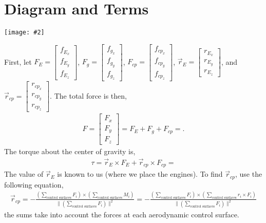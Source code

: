 \documentclass[11pt]{article}
\newcommand{\img}[2]{\begin{center}\texttt{[image: \#2]}\end{center}}
\newcommand{\mathse}[1]{\begin{gather*}#1\end{gather*}}
\newcommand{\norm}[1]{\lVert#1\rVert}
\newcommand{\mat}[1]{\begin{bmatrix} #1 \end{bmatrix}}
\newcommand{\sinput}[1]{}
\begin{document}
\section{Diagram and Terms}
\img{0.99}{diagram.png}

First, let $F_E = \mat{f_{E_x} \\ f_{E_y} \\ f_{E_z}}$, $F_g = \mat{f_{g_x} \\ f_{g_y} \\ f_{g_z}}$, $F_{cp} = \mat{f_{cp_x} \\ f_{cp_y} \\ f_{cp_z}}$, $\vec{r}_E = \mat{r_{E_x} \\ r_{E_y} \\ r_{E_z}}$, and $\vec{r}_{cp} = \mat{r_{cp_x} \\ r_{cp_y} \\ r_{cp_z}}$. The total force is then,
\mathse{
    F = \mat{F_x\\ F_y\\ F_z} = F_E + F_g + F_{cp} = \sinput{F}.
}
The torque about the center of gravity is,
\mathse{
    \tau = \vec{r}_E \times F_E + \vec{r}_{cp} \times F_{cp} = \sinput{tau}
}
The value of $\vec{r}_E$ is known to us (where we place the engines). To find $\vec{r}_{cp}$, use the following equation,
\mathse{
    \vec{r}_{cp} = -\frac{\left(\sum_{\text{control surfaces}} F_i\right)\times \left(\sum_{\text{control surfaces}} M_i\right)}{\norm{\left(\sum_{\text{control surfaces}} F_i\right)}^2} = -\frac{\left(\sum_{\text{control surfaces}} F_i\right)\times \left(\sum_{\text{control surfaces}} r_i\times F_i\right)}{\norm{\left(\sum_{\text{control surfaces}} F_i\right)}^2}
}
the sums take into account the forces at each aerodynamic control surface. 
\end{document}
